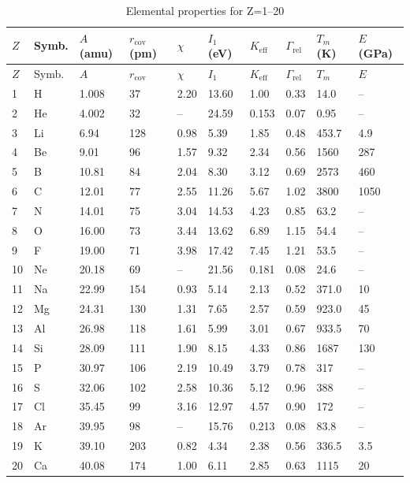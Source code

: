\documentclass[12pt,a4paper]{article}
\newcommand{\Keff}{K_{\mathrm{eff}}}
\begin{document}
	\begin{longtable}{p{0.6cm}p{1.2cm}p{1.2cm}p{1.2cm}p{1.2cm}p{1.2cm}p{1.5cm}p{1.2cm}p{1.2cm}p{1.2cm}}
		\caption{Elemental properties for Z=1–20} \label{tab:elem-data-first20} \\
		\toprule
		\(Z\) & Symb. & \(A\) (amu) & \(r_{\text{cov}}\) (pm) & \(\chi\) & \(I_1\) (eV) & \(\Keff\) & \(\Gamma_{\text{rel}}\) & \(T_m\) (K) & \(E\) (GPa) \\
		\midrule
		\endfirsthead
		\toprule
		\(Z\) & Symb. & \(A\) & \(r_{\text{cov}}\) & \(\chi\) & \(I_1\) & \(\Keff\) & \(\Gamma_{\text{rel}}\) & \(T_m\) & \(E\) \\
		\midrule
		\endhead
		1  & H  & 1.008  & 37   & 2.20 & 13.60 & 1.00  & 0.33  & 14.0  & – \\
		2  & He & 4.002  & 32   & –    & 24.59 & 0.153 & 0.07  & 0.95  & – \\
		3  & Li & 6.94   & 128  & 0.98 & 5.39  & 1.85  & 0.48  & 453.7 & 4.9 \\
		4  & Be & 9.01   & 96   & 1.57 & 9.32  & 2.34  & 0.56  & 1560  & 287 \\
		5  & B  & 10.81  & 84   & 2.04 & 8.30  & 3.12  & 0.69  & 2573  & 460\footnotemark \\
		6  & C  & 12.01  & 77   & 2.55 & 11.26 & 5.67  & 1.02  & 3800  & 1050\footnotemark \\
		7  & N  & 14.01  & 75   & 3.04 & 14.53 & 4.23  & 0.85  & 63.2  & – \\
		8  & O  & 16.00  & 73   & 3.44 & 13.62 & 6.89  & 1.15  & 54.4  & – \\
		9  & F  & 19.00  & 71   & 3.98 & 17.42 & 7.45  & 1.21  & 53.5  & – \\
		10 & Ne & 20.18  & 69   & –    & 21.56 & 0.181 & 0.08  & 24.6  & – \\
		11 & Na & 22.99  & 154  & 0.93 & 5.14  & 2.13  & 0.52  & 371.0 & 10 \\
		12 & Mg & 24.31  & 130  & 1.31 & 7.65  & 2.57  & 0.59  & 923.0 & 45 \\
		13 & Al & 26.98  & 118  & 1.61 & 5.99  & 3.01  & 0.67  & 933.5 & 70 \\
		14 & Si & 28.09  & 111  & 1.90 & 8.15  & 4.33  & 0.86  & 1687  & 130 \\
		15 & P  & 30.97  & 106  & 2.19 & 10.49 & 3.79  & 0.78  & 317   & – \\
		16 & S  & 32.06  & 102  & 2.58 & 10.36 & 5.12  & 0.96  & 388   & – \\
		17 & Cl & 35.45  & 99   & 3.16 & 12.97 & 4.57  & 0.90  & 172   & – \\
		18 & Ar & 39.95  & 98   & –    & 15.76 & 0.213 & 0.08  & 83.8  & – \\
		19 & K  & 39.10  & 203  & 0.82 & 4.34  & 2.38  & 0.56  & 336.5 & 3.5 \\
		20 & Ca & 40.08  & 174  & 1.00 & 6.11  & 2.85  & 0.63  & 1115  & 20 \\
		\bottomrule
	\end{longtable}
\end{document}

